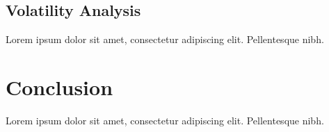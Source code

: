 \documentclass[12pt]{article}
\begin{document}
\newpage
\subsection{Volatility Analysis}
Lorem ipsum dolor sit amet, consectetur adipiscing elit. Pellentesque nibh.


\section{Conclusion}
Lorem ipsum dolor sit amet, consectetur adipiscing elit. Pellentesque nibh.




\end{document}
